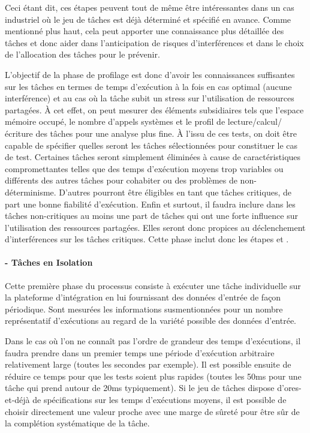 \documentclass[french, a4paper, 11pt, twoside, pdftex]{StyleThese}
\begin{document}
		Ceci étant dit, ces étapes peuvent tout de même être intéressantes dans un cas industriel où le jeu de tâches est déjà déterminé et spécifié en avance. Comme mentionné plus haut, cela peut apporter une connaissance plus détaillée des tâches et donc aider dans l'anticipation de risques d'interférences et dans le choix de l'allocation des tâches pour le prévenir.
		
		L'objectif de la phase de profilage est donc d'avoir les connaissances suffisantes sur les tâches en termes de temps d'exécution à la fois en cas optimal (aucune interférence) et au cas où la tâche subit un stress sur l'utilisation de ressources partagées. À cet effet, on peut mesurer des éléments subsidiaires tels que l'espace mémoire occupé, le nombre d'appels systèmes et le profil de lecture/calcul/écriture des tâches pour une analyse plus fine. À l'issu de ces tests, on doit être capable de spécifier quelles seront les tâches sélectionnées pour constituer le cas de test. Certaines tâches seront simplement éliminées à cause de caractéristiques compromettantes telles que des temps d'exécution moyens trop variables ou différents des autres tâches pour cohabiter ou des problèmes de non-déterminisme. D'autres pourront être éligibles en tant que tâches critiques, de part une bonne fiabilité d'exécution. Enfin et surtout, il faudra inclure dans les tâches non-critiques au moins une part de tâches qui ont une forte influence sur l'utilisation des ressources partagées. Elles seront donc propices au déclenchement d'interférences sur les tâches critiques. Cette phase inclut donc les étapes  et .
		
		\paragraph{ - Tâches en Isolation}
			
			Cette première phase du processus consiste à exécuter une tâche individuelle sur la plateforme d'intégration en lui fournissant des données d'entrée de façon périodique. Sont mesurées les informations susmentionnées pour un nombre représentatif d'exécutions au regard de la variété possible des données d'entrée. 
			
			Dans le cas où l'on ne connaît pas l'ordre de grandeur des temps d'exécutions, il faudra prendre dans un premier temps une période d'exécution arbitraire relativement large (toutes les secondes par exemple). Il est possible ensuite de réduire ce temps pour que les tests soient plus rapides (toutes les 50ms pour une tâche qui prend autour de 20ms typiquement). Si le jeu de tâches dispose d'ores-et-déjà de spécifications sur les temps d'exécutions moyens, il est possible de choisir directement une valeur proche avec une marge de sûreté pour être sûr de la complétion systématique de la tâche.
			
\end{document}

